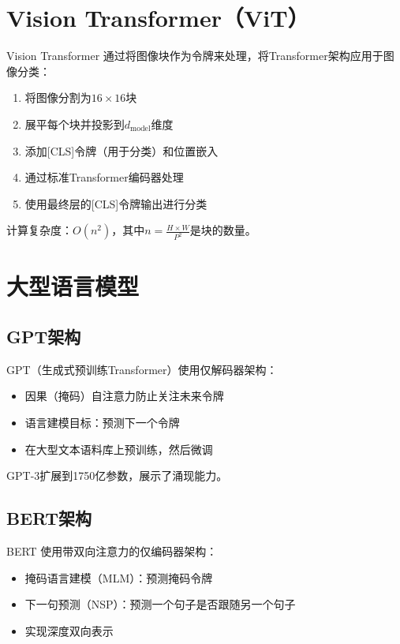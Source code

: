 \section{Vision Transformer（ViT）}

Vision Transformer \cite{dosovitskiy2020image}通过将图像块作为令牌来处理，将Transformer架构应用于图像分类：

\begin{enumerate}
    \item 将图像分割为$16 \times 16$块
    \item 展平每个块并投影到$d_{\text{model}}$维度
    \item 添加[CLS]令牌（用于分类）和位置嵌入
    \item 通过标准Transformer编码器处理
    \item 使用最终层的[CLS]令牌输出进行分类
\end{enumerate}

计算复杂度：$O(n^2)$，其中$n = \frac{H \times W}{P^2}$是块的数量。

\section{大型语言模型}

\subsection{GPT架构}

GPT（生成式预训练Transformer）\cite{radford2019language,brown2020language}使用仅解码器架构：
\begin{itemize}
    \item 因果（掩码）自注意力防止关注未来令牌
    \item 语言建模目标：预测下一个令牌
    \item 在大型文本语料库上预训练，然后微调
\end{itemize}

GPT-3扩展到1750亿参数，展示了涌现能力。

\subsection{BERT架构}

BERT \cite{devlin2018bert}使用带双向注意力的仅编码器架构：
\begin{itemize}
    \item 掩码语言建模（MLM）：预测掩码令牌
    \item 下一句预测（NSP）：预测一个句子是否跟随另一个句子
    \item 实现深度双向表示
\end{itemize}

